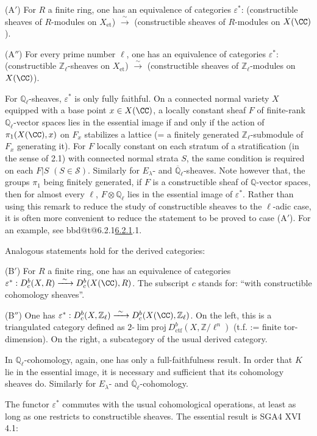 \documentclass[12pt,oneside]{amsbook}
\makeatletter
\DeclareRobustCommand{\rn}[1]{%
  \ifcsname bbd@t@#1\endcsname\hyperlink{bbd:#1}{#1}\else#1\fi}
\theoremstyle{plain}
\theoremstyle{definition}
\newcommand{\ZZ}{\mathbb{Z}}  \newcommand{\QQ}{\mathbb{Q}}
\newcommand{\Zl}{\mathbb{Z}_{\ell}}
\newcommand{\Ql}{\mathbb{Q}_{\ell}}
\newcommand{\Qlb}{\overline{\mathbb{Q}}_{\ell}}
\newcommand{\Db}{D^{b}}
\newcommand{\isoto}{\xrightarrow{\ \sim\ }}
\makeatother
\begin{document}
\smallskip
(A$'$) For $R$ a finite ring, one has an equivalence of categories $\varepsilon^{*}$: (constructible sheaves of $R$-modules on $X_{\mathrm{et}}$) $\isoto$ (constructible sheaves of $R$-modules on $X(\CC)$).

\smallskip
(A$''$) For every prime number $\ell$, one has an equivalence of categories $\varepsilon^{*}$: (constructible $\Zl$-sheaves on $X_{\mathrm{et}}$) $\isoto$ (constructible sheaves of $\Zl$-modules on $X(\CC)$).

\smallskip
For $\Ql$-sheaves, $\varepsilon^{*}$ is only fully faithful. On a connected normal variety $X$ equipped with a base point $x\in X(\CC)$, a locally constant sheaf $F$ of finite-rank $\Ql$-vector spaces lies in the essential image if and only if the action of $\pi_{1}(X(\CC),x)$ on $F_{x}$ stabilizes a lattice (= a finitely generated $\Zl$-submodule of $F_{x}$ generating it). For $F$ locally constant on each stratum of a stratification (in the sense of 2.1) with connected normal strata $S$, the same condition is required on each $F|S$ $(S\in \mathcal{S})$. Similarly for $E_{\lambda}$- and $\Qlb$-sheaves. Note however that, the groups $\pi_{1}$ being finitely generated, if $F$ is a constructible sheaf of $\QQ$-vector spaces, then for almost every $\ell$, $F\otimes\Ql$ lies in the essential image of $\varepsilon^{*}$. Rather than using this remark to reduce the study of constructible sheaves to the $\ell$-adic case, it is often more convenient to reduce the statement to be proved to case (A$'$). For an example, see \rn{6.2.1}.

\smallskip
Analogous statements hold for the derived categories:

\smallskip
(B$'$) For $R$ a finite ring, one has an equivalence of categories $\varepsilon^{*} : \Db_{c}(X,R)\isoto \Db_{c}(X(\CC),R)$. The subscript $c$ stands for: ``with constructible cohomology sheaves''.

\smallskip
(B$''$) One has $\varepsilon^{*} : \Db_{c}(X,\Zl)\isoto \Db_{c}(X(\CC),\Zl)$. On the left, this is a triangulated category defined as $2\text{-}\lim\mathrm{proj}\ \Db_{\mathrm{ctf}}(X,\ZZ/\ell^{n})$ (t.f. := finite tor-dimension). On the right, a subcategory of the usual derived category.

\smallskip
In $\Ql$-cohomology, again, one has only a full-faithfulness result. In order that $K$ lie in the essential image, it is necessary and sufficient that its cohomology sheaves do. Similarly for $E_{\lambda}$- and $\Qlb$-cohomology.

\smallskip
The functor $\varepsilon^{*}$ commutes with the usual cohomological operations, at least as long as one restricts to constructible sheaves. The essential result is SGA4 XVI 4.1:
\end{document}
